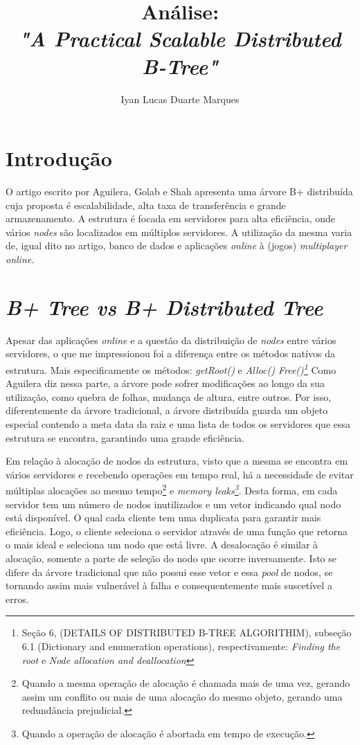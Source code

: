 \documentclass[12pt]{article}
\title{Análise:\\ \textit{"A Practical Scalable Distributed B-Tree"}}
\author{Iyan Lucas Duarte Marques\inst{1}}
\begin{document}
\maketitle
\section{Introdução}
O artigo escrito por Aguilera, Golab e Shah apresenta uma árvore B+ distribuída cuja proposta é escalabilidade, alta taxa de transferência e grande armazenamento.
A estrutura é focada em servidores para alta eficiência, onde vários \textit{nodes} são localizados em múltiplos servidores.
A utilização da mesma varia de, igual dito no artigo, banco de dados e aplicações \textit{online} à (jogos) \textit{multiplayer online}.

\section{\textit{B+ Tree vs B+ Distributed Tree}}
Apesar das aplicações \textit{online} e a questão da distribuição de \textit{nodes} entre vários servidores, o que me impressionou foi a diferença entre os métodos natívos da estrutura.
Mais especificamente os métodos: \textit{getRoot()} e \textit{Alloc() Free()\footnote{Seção 6, (DETAILS OF DISTRIBUTED B-TREE ALGORITHIM), subseção 6.1 (Dictionary and enumeration operations), respectivamente: \textit{Finding the root} e \textit{Node allocation and deallocation}}}
Como Aguilera diz nessa parte, a árvore pode sofrer modificações ao longo da sua utilização, como quebra de folhas, mudança de altura, entre outros. 
Por isso, diferentemente da árvore tradicional, a árvore distribuída guarda um objeto especial contendo a meta data da raiz e uma lista de todos os servidores que essa estrutura se encontra, garantindo uma grande eficiência.
\par Em relação à alocação de nodos da estrutura, visto que a mesma se encontra em vários servidores e recebendo operações em tempo real, há a necessidade de evitar múltiplas alocações ao mesmo tempo\footnote{
    Quando a mesma operação de alocação é chamada mais de uma vez, gerando assim um conflito ou mais de uma alocação do mesmo objeto, gerando uma redundância prejudicial.
} e \textit{memory leaks\footnote{Quando a operação de alocação é abortada em tempo de execução.}}.
Desta forma, em cada servidor tem um número de nodos inutilizados e um vetor indicando qual nodo está disponível.
O qual cada cliente tem uma duplicata para garantir mais eficiência.
Logo, o cliente seleciona o servidor através de uma função que retorna o mais ideal e seleciona um nodo que está livre. 
A desalocação é similar à alocação, somente a parte de seleção do nodo que ocorre inversamente.
Isto se difere da árvore tradicional que não possui esse vetor e essa \textit{pool} de nodos, se tornando assim mais vulnerável à falha e consequentemente mais suscetível a erros.
\end{document}
